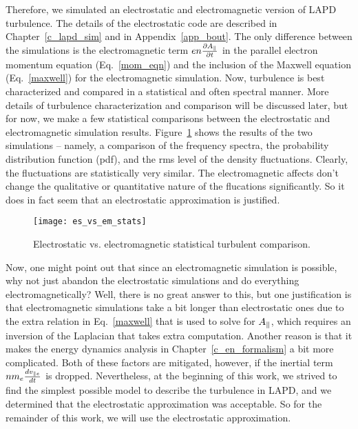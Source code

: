 Therefore, we simulated an electrostatic and electromagnetic version of LAPD turbulence. The details of the electrostatic code are described in Chapter~\ref{c_lapd_sim} and in Appendix~\ref{app_bout}.
The only difference between the simulations is the electromagnetic term $e n \frac{\partial A_\parallel}{\partial t}$ in the parallel electron momentum equation (Eq.~\ref{mom_eqn}) and the inclusion of the Maxwell equation
(Eq.~\ref{maxwell}) for the electromagnetic simulation. Now, turbulence is best characterized and compared in a statistical and often spectral manner. 
More details of turbulence characterization and comparison will be discussed later, but for now, we make a few statistical comparisons between the electrostatic and electromagnetic simulation results.
Figure~\ref{es_vs_em_stats} shows the results of the two simulations -- namely, a comparison of the frequency spectra, the probability distribution function (pdf), and the rms level of the density
fluctuations. Clearly, the fluctuations are statistically very similar. The electromagnetic affects don't change the qualitative or quantitative nature of the flucations significantly. So it does
in fact seem that an electrostatic approximation is justified.

\begin{figure}[!htbp]
\texttt{[image: es\_vs\_em\_stats]}
\hfil
\caption{Electrostatic vs. electromagnetic statistical turbulent comparison.}
\label{es_vs_em_stats}
\end{figure}

Now, one might point out that since an electromagnetic simulation is possible, why not just abandon the electrostatic simulations and do everything electromagnetically? 
Well, there is no great answer to this, but one justification is that electromagnetic
simulations take a bit longer than electrostatic ones due to the extra relation in Eq.~\ref{maxwell} that is used to solve for $A_\parallel$, which requires an inversion of the Laplacian that
takes extra computation. Another reason is that it makes the energy dynamics analysis in Chapter~\ref{c_en_formalism} a bit more complicated. Both of these factors are mitigated, 
however, if the inertial term $n m_e \frac{dv_{\parallel e}}{dt}$ is dropped. Nevertheless, at the beginning of this work, we strived to find the simplest possible model to describe the turbulence in LAPD,
and we determined that the electrostatic approximation was acceptable. So for the remainder of this work, we will use the electrostatic approximation.
